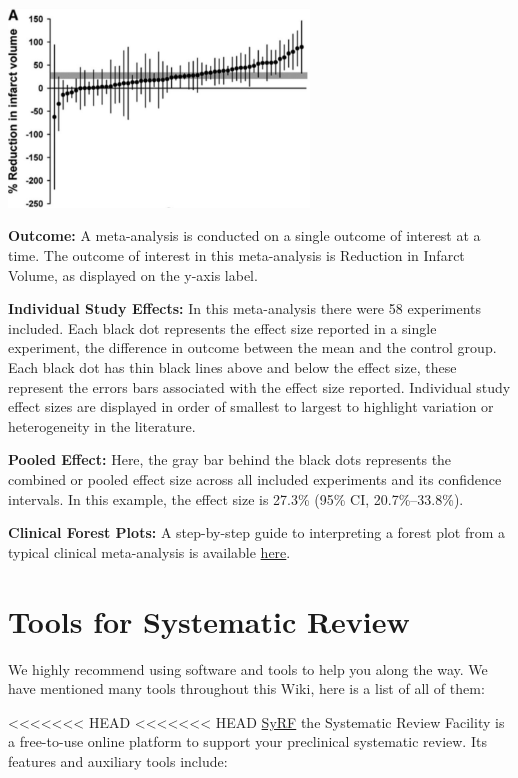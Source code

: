 \documentclass[
]{book}
\begin{document}
\includegraphics[width=0.6\textwidth,height=\textheight]{figs/timberplot.png}

\textbf{Outcome:}
A meta-analysis is conducted on a single outcome of interest at a time. The outcome of interest in this meta-analysis is Reduction in Infarct Volume, as displayed on the y-axis label.

\textbf{Individual Study Effects:}
In this meta-analysis there were 58 experiments included. Each black dot represents the effect size reported in a single experiment, the difference in outcome between the mean and the control group. Each black dot has thin black lines above and below the effect size, these represent the errors bars associated with the effect size reported. Individual study effect sizes are displayed in order of smallest to largest to highlight variation or heterogeneity in the literature.

\textbf{Pooled Effect:}
Here, the gray bar behind the black dots represents the combined or pooled effect size across all included experiments and its confidence intervals. In this example, the effect size is 27.3\% (95\% CI, 20.7\%--33.8\%).

\textbf{Clinical Forest Plots:} A step-by-step guide to interpreting a forest plot from a typical clinical meta-analysis is available \href{https://s4be.cochrane.org/blog/2016/07/11/tutorial-read-forest-plot/}{here}.

\hypertarget{tools-for-systematic-review}{%
\chapter{Tools for Systematic Review}\label{tools-for-systematic-review}}

We highly recommend using software and tools to help you along the way. We have mentioned many tools throughout this Wiki, here is a list of all of them:

\textless\textless\textless\textless\textless\textless\textless{} HEAD
\textless\textless\textless\textless\textless\textless\textless{} HEAD
\href{https://syrf.org.uk/}{SyRF} the Systematic Review Facility is a free-to-use online platform to support your preclinical systematic review. Its features and auxiliary tools include:
\end{document}
